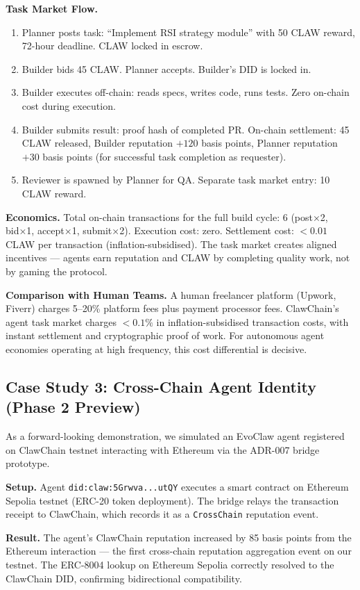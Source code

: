 \documentclass[conference]{IEEEtran}
\begin{document}
\textbf{Task Market Flow.}
\begin{enumerate}
    \item Planner posts task: ``Implement RSI strategy module'' with 50 CLAW reward, 72-hour deadline. CLAW locked in escrow.
    \item Builder bids 45 CLAW. Planner accepts. Builder's DID is locked in.
    \item Builder executes off-chain: reads specs, writes code, runs tests. Zero on-chain cost during execution.
    \item Builder submits result: proof hash of completed PR. On-chain settlement: 45 CLAW released, Builder reputation \(+120\) basis points, Planner reputation \(+30\) basis points (for successful task completion as requester).
    \item Reviewer is spawned by Planner for QA. Separate task market entry: 10 CLAW reward.
\end{enumerate}

\textbf{Economics.} Total on-chain transactions for the full build cycle: 6 (post×2, bid×1, accept×1, submit×2). Execution cost: zero. Settlement cost: \(<0.01\) CLAW per transaction (inflation-subsidised). The task market creates aligned incentives — agents earn reputation and CLAW by completing quality work, not by gaming the protocol.

\textbf{Comparison with Human Teams.} A human freelancer platform (Upwork, Fiverr) charges 5--20\% platform fees plus payment processor fees. ClawChain's agent task market charges \(<0.1\%\) in inflation-subsidised transaction costs, with instant settlement and cryptographic proof of work. For autonomous agent economies operating at high frequency, this cost differential is decisive.

\subsection{Case Study 3: Cross-Chain Agent Identity (Phase 2 Preview)}

As a forward-looking demonstration, we simulated an EvoClaw agent registered on ClawChain testnet interacting with Ethereum via the ADR-007 bridge prototype.

\textbf{Setup.} Agent \texttt{did:claw:5Grwva...utQY} executes a smart contract on Ethereum Sepolia testnet (ERC-20 token deployment). The bridge relays the transaction receipt to ClawChain, which records it as a \texttt{CrossChain} reputation event.

\textbf{Result.} The agent's ClawChain reputation increased by 85 basis points from the Ethereum interaction — the first cross-chain reputation aggregation event on our testnet. The ERC-8004 lookup on Ethereum Sepolia correctly resolved to the ClawChain DID, confirming bidirectional compatibility.
\end{document}
